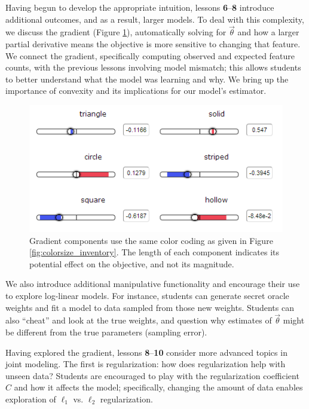 \documentclass[11pt,letterpaper]{article}
\begin{document}
Having begun to develop the appropriate intuition, lessons \textbf{6}--\textbf{8} introduce 
additional outcomes, and as a result, larger models. To deal with this complexity, we discuss the gradient 
(Figure \ref{fig:gradients}), 
automatically solving for $\vec{\theta}$ and how a larger partial derivative means the objective is more 
sensitive to changing that feature. We connect the gradient, specifically computing observed and expected feature 
counts, with the previous lessons involving model mismatch; this allows students to better understand what the 
model was learning and why. 
We bring up the importance of convexity and its implications for our model's estimator.

\begin{figure}[t]
\centering
\small
\includegraphics[scale=.65]{images/gradient-lesson7.PNG}
\caption{Gradient components use the same color coding as given in Figure \ref{fig:colorsize_inventory}. The length of each component indicates its potential effect on the objective, and not its magnitude.}
\label{fig:gradients}
\end{figure}

We also introduce additional manipulative functionality and encourage their use to 
explore log-linear models. For instance, students can generate secret oracle weights and 
fit a model to data sampled from those new weights. Students can also ``cheat'' and look at the true 
weights,  and question why estimates of $\vec{\theta}$ might be different from the true parameters 
(sampling error).

Having explored the gradient, lessons \textbf{8}--\textbf{10} consider more advanced topics in joint 
modeling. The first is regularization: how does regularization help with unseen data? Students are encouraged 
to play with the regularization coefficient $C$ and how it affects the model; specifically, changing the amount 
of data enables exploration of $\ell_1$ vs. $\ell_2$ regularization.
\end{document}
